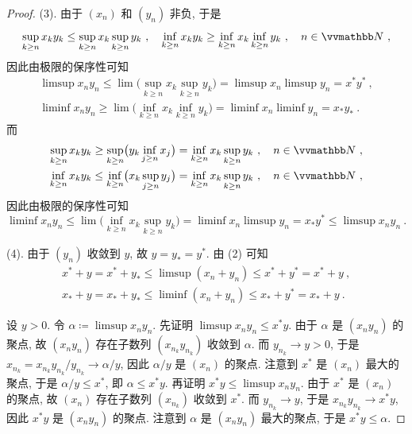 \begin{proof}
    (3). 由于 \((x_n)\) 和 \((y_n)\) 非负, 于是
    \[
        \sup_{k \geq n} x_k y_k \leq \sup_{k \geq n} x_k \sup_{k \geq n} y_k\ ,\quad \inf_{k \geq n} x_k y_k \geq \inf_{k \geq n} x_k \inf_{k \geq n} y_k\ ,\quad n \in \N\ ,
    \]
    因此由极限的保序性可知
    \begin{align*}
        \limsup x_n y_n \leq \lim \bigl(\sup_{k \geq n} x_k \sup_{k \geq n} y_k\bigr) = \limsup x_n \limsup y_n = x^\ast y^\ast\ ,\\
        \liminf x_n y_n \geq \lim \bigl(\inf_{k \geq n} x_k \inf_{k \geq n} y_k\bigr) = \liminf x_n \liminf y_n = x_\ast y_\ast\ .
    \end{align*}
    而
    \begin{align*}
        \sup_{k \geq n} x_k y_k \geq \sup_{k \geq n} \bigl(y_k \inf_{j \geq n} x_j\bigr) = \inf_{k \geq n} x_k \sup_{k \geq n} y_k\ ,\quad n \in \N\ ,\\
        \inf_{k \geq n} x_k y_k \leq \inf_{k \geq n} \bigl(x_k \sup_{j \geq n} y_j\bigr) = \inf_{k \geq n} x_k \sup_{k \geq n} y_k\ ,\quad n \in \N\ ,
    \end{align*}
    因此由极限的保序性可知
    \[
        \liminf x_n y_n \leq \lim \bigl(\inf_{k \geq n} x_k \sup_{k \geq n} y_k\bigr) = \liminf x_n \limsup y_n = x_\ast y^\ast \leq \limsup x_n y_n\ .
    \]

    (4). 由于 \((y_n)\) 收敛到 \(y\), 故 \(y = y_\ast = y^\ast\). 由 (2) 可知
    \begin{align*}
        x^\ast + y = x^\ast + y_\ast \leq \limsup (x_n + y_n) \leq x^\ast + y^\ast = x^\ast + y\ ,\\
        x_\ast + y = x_\ast + y_\ast \leq \liminf (x_n + y_n) \leq x_\ast + y^\ast = x_\ast + y\ .
    \end{align*}

    设 \(y > 0\). 令 \(\alpha \coloneqq \limsup x_n y_n\). 先证明 \(\limsup x_n y_n \leq x^\ast y\). 由于 \(\alpha\) 是 \((x_n y_n)\) 的聚点, 故 \((x_n y_n)\) 存在子数列 \((x_{n_k} y_{n_k})\) 收敛到 \(\alpha\). 而 \(y_{n_k} \to y > 0\), 于是 \(x_{n_k} = x_{n_k} y_{n_k} / y_{n_k} \to \alpha / y\), 因此 \(\alpha / y\) 是 \((x_n)\) 的聚点. 注意到 \(x^\ast\) 是 \((x_n)\) 最大的聚点, 于是 \(\alpha / y \leq x^\ast\), 即 \(\alpha \leq x^\ast y\). 再证明 \(x^\ast y \leq \limsup x_n y_n\). 由于 \(x^\ast\) 是 \((x_n)\) 的聚点, 故 \((x_n)\) 存在子数列 \((x_{n_k})\) 收敛到 \(x^\ast\). 而 \(y_{n_k} \to y\), 于是 \(x_{n_k} y_{n_k} \to x^\ast y\), 因此 \(x^\ast y\) 是 \((x_n y_n)\) 的聚点. 注意到 \(\alpha\) 是 \((x_n y_n)\) 最大的聚点, 于是 \(x^\ast y \leq \alpha\).


\end{proof}

